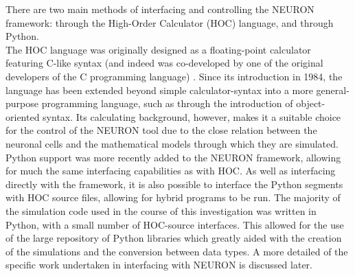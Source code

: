 \par

There are two main methods of interfacing and controlling the NEURON framework: through the High-Order Calculator (HOC) language, and through Python.\\
The HOC language was originally designed as a floating-point calculator featuring C-like syntax (and indeed was co-developed by one of the original developers of the C programming language) \cite{kernighan1979unix}. Since its introduction in 1984, the language has been extended beyond simple calculator-syntax into a more general-purpose programming language, such as through the introduction of object-oriented syntax. Its calculating background, however, makes it a suitable choice for the control of the NEURON tool due to the close relation between the neuronal cells and the mathematical models through which they are simulated.\\ %
Python support was more recently added to the NEURON framework, allowing for much the same interfacing capabilities as with HOC. As well as interfacing directly with the framework, it is also possible to interface the Python segments with HOC source files, allowing for hybrid programs to be run. The majority of the simulation code used in the course of this investigation was written in Python, with a small number of HOC-source interfaces. This allowed for the use of the large repository of Python libraries which greatly aided with the creation of the simulations and the conversion between data types. A more detailed of the specific work undertaken in interfacing with NEURON is discussed later.

\par

